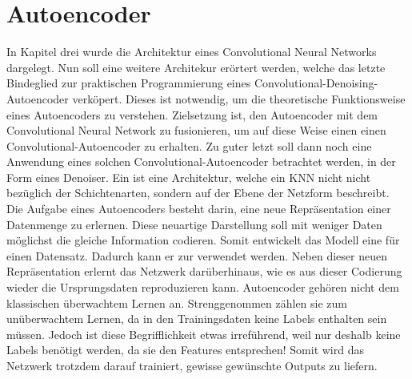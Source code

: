 \chapter{Autoencoder}\label{sec:autoencoder}
In Kapitel drei wurde die Architektur eines Convolutional Neural Networks dargelegt.
Nun soll eine weitere Architekur erörtert werden, welche das letzte Bindeglied zur
praktischen Programmierung eines Convolutional-Denoising-Autoencoder verköpert.
Dieses ist notwendig, um die theoretische Funktionsweise eines Autoencoders zu verstehen.
Zielsetzung ist, den Autoencoder mit dem Convolutional
Neural Network zu fusionieren, um auf diese Weise einen einen
Convolutional-Autoencoder zu erhalten. Zu
guter letzt soll dann noch eine Anwendung eines solchen
Convolutional-Autoencoder betrachtet werden, in der Form eines Denoiser.
\para{}
\bigskip
Ein  ist eine Architektur, welche ein KNN nicht
nicht bezüglich der Schichtenarten, sondern auf der Ebene der Netzform beschreibt.
Die Aufgabe eines Autoencoders besteht darin, eine neue Repräsentation einer Datenmenge
zu erlernen. Diese neuartige Darstellung soll mit weniger Daten möglichst die gleiche
Information codieren. Somit entwickelt das Modell eine  für einen Datensatz. Dadurch kann er zur
 verwendet werden.
Neben dieser neuen Repräsentation erlernt das Netzwerk darüberhinaus, wie es
aus dieser Codierung wieder die Ursprungsdaten reproduzieren kann.
\para{}
Autoencoder gehören nicht dem klassischen überwachtem Lernen an. Strenggenommen
zählen sie zum unüberwachtem Lernen, da in den Trainingsdaten keine Labels
enthalten sein müssen. Jedoch ist diese Begrifflichkeit etwas irreführend,
weil nur deshalb keine Labels benötigt werden, da sie den Features entsprechen!
Somit wird das Netzwerk trotzdem darauf trainiert, gewisse gewünschte Outputs
zu liefern.
\para{}
\cite{book:autoencoder}

